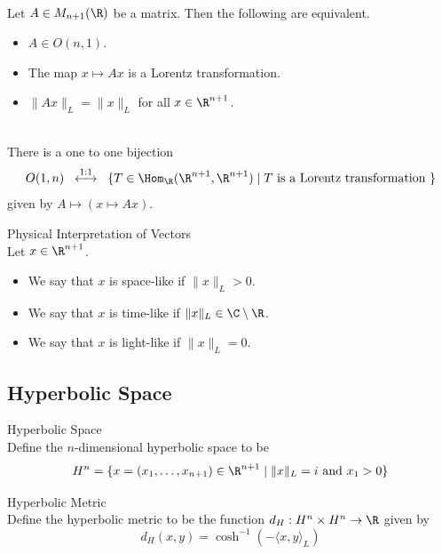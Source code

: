 \documentclass[a4paper]{article}
\begin{document}
\begin{prp}{}{}\\
Let $A\in M_{n+1}(\R)$ be a matrix. Then the following are equivalent. 
\begin{itemize}
\item $A\in O(n,1)$. 
\item The map $x\mapsto Ax$ is a Lorentz transformation. 
\item $\|Ax\|_L=\|x\|_L$ for all $x\in\R^{n+1}$. 
\end{itemize}
\end{prp}

\begin{prp}{}{}\\
There is a one to one bijection $$O(1,n)\;\;\overset{1:1}{\longleftrightarrow}\;\;\{T\in\Hom_\R(\R^{n+1},\R^{n+1})\;|\;T\text{ is a Lorentz transformation }\}$$ given by $A\mapsto(x\mapsto Ax)$. 
\end{prp}

\begin{defn}{Physical Interpretation of Vectors}{}\\
Let $x\in\R^{n+1}$. 
\begin{itemize}
\item We say that $x$ is space-like if $\|x\|_L>0$. 
\item We say that $x$ is time-like if $\|x\|_L\in\C\setminus\R$. 
\item We say that $x$ is light-like if $\|x\|_L=0$. 
\end{itemize}
\end{defn}

\subsection{Hyperbolic Space}
\begin{defn}{Hyperbolic Space}{}\\
Define the $n$-dimensional hyperbolic space to be $$H^n=\{x=(x_1,\dots,x_{n+1})\in\R^{n+1}\;|\;\|x\|_L=i\text{ and }x_1>0\}$$
\end{defn}

\begin{defn}{Hyperbolic Metric}{}\\
Define the hyperbolic metric to be the function $d_H:H^n\times H^n\to\R$ given by $$d_H(x,y)=\cosh^{-1}(-\langle x,y\rangle_L)$$
\end{defn}
\end{document}
